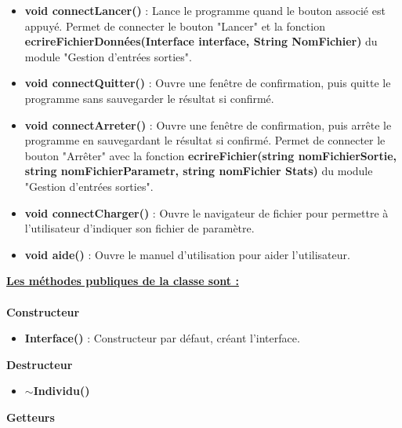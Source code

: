 \documentclass[a4paper,11pt]{article}
\begin{document}
			\begin{itemize}
				\item \textbf{void connectLancer()} : Lance le programme quand le bouton associé est appuyé. Permet de connecter le bouton "Lancer" et la fonction \textbf{ecrireFichierDonnées(Interface interface, String NomFichier)} du module "Gestion d'entrées sorties".\vspace{0.2cm}
				\item \textbf{void connectQuitter()} : Ouvre une fenêtre de confirmation, puis quitte le programme sans sauvegarder le résultat si confirmé.\vspace{0.2cm}
				\item \textbf{void connectArreter()} : Ouvre une fenêtre de confirmation, puis arrête le programme en sauvegardant le résultat si confirmé. Permet de connecter le bouton "Arrêter" avec la fonction \textbf{ecrireFichier(string nomFichierSortie, string nomFichierParametr, string nomFichier Stats)} du module "Gestion d'entrées sorties".\vspace{0.2cm} 
				\item \textbf{void connectCharger()} : Ouvre le navigateur de fichier pour permettre à l’utilisateur d’indiquer son fichier de paramètre.\vspace{0.2cm}
				\item \textbf{void aide()} : Ouvre le manuel d’utilisation pour aider l’utilisateur.\\
			\end{itemize}
			\underline{\bf Les méthodes publiques de la classe sont :}\\\\
			\textbf{Constructeur}
				\begin{itemize}
					\item \textbf{Interface()} : Constructeur par défaut, créant l'interface.\\
					\end{itemize}
			\textbf{Destructeur}
				\begin{itemize}
					\item \textbf{$\sim$Individu()}\\
				\end{itemize}
			\textbf{Getteurs}
\end{document}
